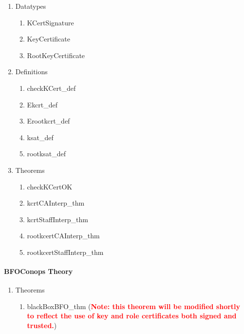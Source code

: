 \message{ !name(secureMessages.tex)}\documentclass[10pt,twoside]{article}
\newcommand{\redtext}[1]{\textcolor{red}{#1}}
\begin{document}
\begin{enumerate}
\item Datatypes
  \begin{enumerate}[{a.}]
  \item KCertSignature
  \item KeyCertificate
  \item RootKeyCertificate
  \end{enumerate}

\item Definitions
  \begin{enumerate}[{a.}]
  \item checkKCert\_def
  \item Ekcrt\_def
  \item Erootkcrt\_def
  \item ksat\_def
  \item rootksat\_def
  \end{enumerate}

\item Theorems
  \begin{enumerate}[{a.}]
  \item checkKCertOK
  \item kcrtCAInterp\_thm
  \item kcrtStaffInterp\_thm
  \item rootkcertCAInterp\_thm
  \item rootkcertStaffInterp\_thm
  \end{enumerate}

\end{enumerate}

\paragraph{BFOConops Theory}

\begin{enumerate}
\item Theorems
  \begin{enumerate}[{a.}]
  \item blackBoxBFO\_thm (\textbf{\redtext{Note: this theorem will be modified
      shortly to reflect the use of key and role certificates both
      signed and trusted.}})
  \end{enumerate}

\end{enumerate}




\newpage{}
\end{document}
